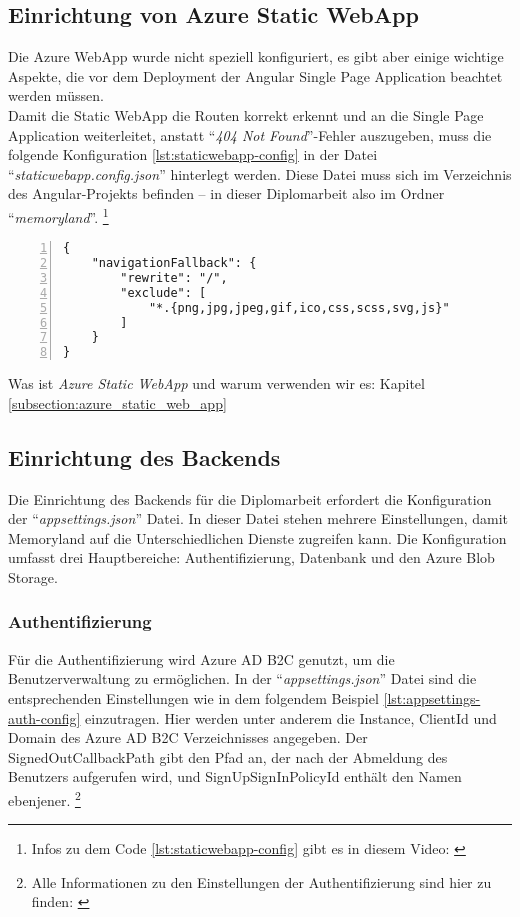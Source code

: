 \subsection{Einrichtung von Azure Static WebApp}

Die Azure WebApp wurde nicht speziell konfiguriert, es gibt aber einige wichtige Aspekte, 
die vor dem Deployment der Angular Single Page Application beachtet werden müssen.  
\\
Damit die Static WebApp die Routen korrekt erkennt und an die Single Page Application 
weiterleitet, anstatt ``\emph{404 Not Found}''-Fehler auszugeben, muss die folgende 
Konfiguration \ref{lst:staticwebapp-config} in der Datei ``\emph{staticwebapp.config.json}'' hinterlegt werden. 
Diese Datei muss sich im Verzeichnis des Angular-Projekts befinden -- in dieser Diplomarbeit
also im Ordner ``\emph{memoryland}''. \footnote{Infos zu dem Code \ref{lst:staticwebapp-config} gibt es in diesem Video: \cite{MicrosoftCorporationj}}

\begin{lstlisting}[numbers=left,caption={staticwebapp.config.json},label={lst:staticwebapp-config}]
{
    "navigationFallback": {
        "rewrite": "/",
        "exclude": [
            "*.{png,jpg,jpeg,gif,ico,css,scss,svg,js}"
        ]
    }
}
\end{lstlisting}

Was ist \emph{Azure Static WebApp} und warum verwenden wir es: Kapitel \ref{subsection:azure_static_web_app}


\subsection{Einrichtung des Backends}

Die Einrichtung des Backends für die Diplomarbeit erfordert die Konfiguration 
der ``\emph{appsettings.json}'' Datei. In dieser Datei stehen mehrere Einstellungen,
damit Memoryland auf die Unterschiedlichen Dienste zugreifen kann. Die Konfiguration 
umfasst drei Hauptbereiche: Authentifizierung, Datenbank und den Azure Blob Storage.

\subsubsection{Authentifizierung}

Für die Authentifizierung wird Azure AD B2C genutzt, um die Benutzerverwaltung zu ermöglichen. 
In der ``\emph{appsettings.json}'' Datei sind die entsprechenden Einstellungen wie in dem folgendem
Beispiel \ref{lst:appsettings-auth-config} einzutragen. Hier werden unter anderem die Instance, ClientId und Domain des 
Azure AD B2C Verzeichnisses angegeben. Der SignedOutCallbackPath gibt den Pfad an, der nach 
der Abmeldung des Benutzers aufgerufen wird, und SignUpSignInPolicyId enthält den Namen ebenjener.
\footnote{Alle Informationen zu den Einstellungen der Authentifizierung sind hier zu finden: \cite{MicrosoftCorporationk}}

